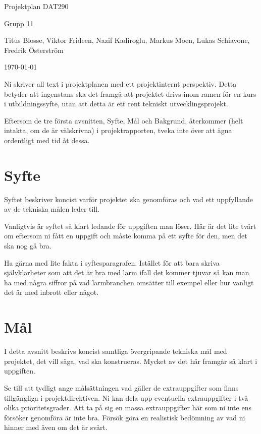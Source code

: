 \documentclass[a4paper]{article}
\begin{document}
\begin{center}
\thispagestyle{empty}
\parskip=14pt%
\vspace*{3\parskip}%

{\LARGE Projektplan DAT290}

{\large Grupp 11

Titus Blosse, Viktor Frideen, Nazif Kadiroglu, Markus Moen, Lukas Schiavone, Fredrik Österström

\today}

\end{center}
\newpage

\tableofcontents
\newpage

Ni skriver all text i projektplanen med ett projektinternt perspektiv.
Detta betyder att ingenstans ska det framgå att projektet drivs inom
ramen för en kurs i utbildningssyfte, utan att detta är ett rent
tekniskt utvecklingsprojekt.

Eftersom de tre första avsnitten, Syfte, Mål och Bakgrund, återkommer
(helt intakta, om de är välskrivna) i projektrapporten, tveka inte över
att ägna ordentligt med tid åt dessa.



\section {Syfte}


Syftet beskriver koncist varför projektet ska genomföras och vad ett
uppfyllande av de tekniska målen leder till.

Vanligtvis är syftet så klart ledande för uppgiften man löser. Här är
det lite tvärt om eftersom ni fått en uppgift och måste komma på ett
syfte för den, men det ska nog gå bra.

Ha gärna med lite fakta i syftesparagrafen. Istället för att bara skriva
självklarheter som att det är bra med larm ifall det kommer tjuvar så
kan man ha med några siffror på vad larmbranchen omsätter till exempel
eller hur vanligt det är med inbrott eller något.



\section {Mål}


I detta avsnitt beskrivs koncist samtliga övergripande tekniska mål med
projektet, det vill säga, vad ska konstrueras. Mycket av det här
framgår så klart i uppgiften.

Se till att tydligt ange målsättningen vad gäller de extrauppgifter som
finns tillgängliga i projektdirektiven. Ni kan dela upp eventuella
extrauppgifter i två olika prioritetsgrader. Att ta på sig en massa
extrauppgifter här som ni inte ens försöker genomföra är inte bra.
Försök göra en realistisk bedömning av vad ni hinner med även om det är
svårt.
\end{document}
